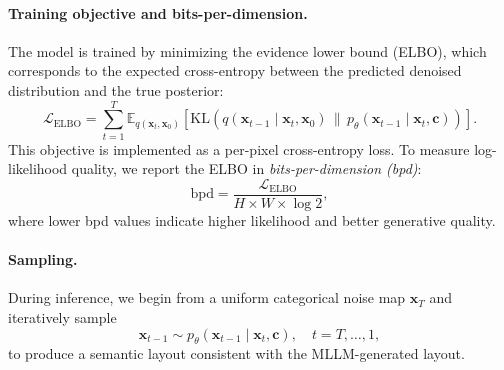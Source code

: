 \documentclass{article}
\begin{document}
\paragraph{Training objective and bits-per-dimension.}
The model is trained by minimizing the evidence lower bound (ELBO), which corresponds to the expected cross-entropy between the predicted denoised distribution and the true posterior:
\begin{equation}
    \mathcal{L}_{\text{ELBO}} =
    \sum_{t=1}^T
    \mathbb{E}_{q(\mathbf{x}_t, \mathbf{x}_0)}\!\left[
        \mathrm{KL}\!\left(
        q(\mathbf{x}_{t-1}\mid\mathbf{x}_t,\mathbf{x}_0)
        \,\|\, 
        p_\theta(\mathbf{x}_{t-1}\mid\mathbf{x}_t,\mathbf{c})
        \right)
    \right].
\end{equation}
This objective is implemented as a per-pixel cross-entropy loss.  
To measure log-likelihood quality, we report the ELBO in \textit{bits-per-dimension (bpd)}:
\begin{equation}
    \mathrm{bpd} = 
    \frac{\mathcal{L}_{\text{ELBO}}}{H \times W \times \log 2},
\end{equation}
where lower bpd values indicate higher likelihood and better generative quality.



\paragraph{Sampling.}
During inference, we begin from a uniform categorical noise map $\mathbf{x}_T$ and iteratively sample
\[
    \mathbf{x}_{t-1} \sim p_\theta(\mathbf{x}_{t-1}\mid \mathbf{x}_t, \mathbf{c}), \quad
    t = T, \ldots, 1,
\]
to produce a semantic layout consistent with the MLLM-generated layout.
\end{document}
